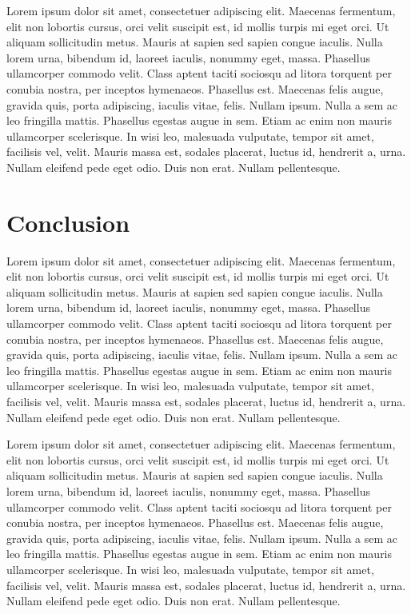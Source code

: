 Lorem ipsum dolor sit amet, consectetuer adipiscing elit. Maecenas fermentum, elit non lobortis cursus, orci velit suscipit est, id mollis turpis mi eget orci. Ut aliquam sollicitudin metus. Mauris at sapien sed sapien congue iaculis. Nulla lorem urna, bibendum id, laoreet iaculis, nonummy eget, massa. Phasellus ullamcorper commodo velit. Class aptent taciti sociosqu ad litora torquent per conubia nostra, per inceptos hymenaeos. Phasellus est. Maecenas felis augue, gravida quis, porta adipiscing, iaculis vitae, felis. Nullam ipsum. Nulla a sem ac leo fringilla mattis. Phasellus egestas augue in sem. Etiam ac enim non mauris ullamcorper scelerisque. In wisi leo, malesuada vulputate, tempor sit amet, facilisis vel, velit. Mauris massa est, sodales placerat, luctus id, hendrerit a, urna. Nullam eleifend pede eget odio. Duis non erat. Nullam pellentesque.

\section{Conclusion}


Lorem ipsum dolor sit amet, consectetuer adipiscing elit. Maecenas fermentum, elit non lobortis cursus, orci velit suscipit est, id mollis turpis mi eget orci. Ut aliquam sollicitudin metus. Mauris at sapien sed sapien congue iaculis. Nulla lorem urna, bibendum id, laoreet iaculis, nonummy eget, massa. Phasellus ullamcorper commodo velit. Class aptent taciti sociosqu ad litora torquent per conubia nostra, per inceptos hymenaeos. Phasellus est. Maecenas felis augue, gravida quis, porta adipiscing, iaculis vitae, felis. Nullam ipsum. Nulla a sem ac leo fringilla mattis. Phasellus egestas augue in sem. Etiam ac enim non mauris ullamcorper scelerisque. In wisi leo, malesuada vulputate, tempor sit amet, facilisis vel, velit. Mauris massa est, sodales placerat, luctus id, hendrerit a, urna. Nullam eleifend pede eget odio. Duis non erat. Nullam pellentesque.

Lorem ipsum dolor sit amet, consectetuer adipiscing elit. Maecenas fermentum, elit non lobortis cursus, orci velit suscipit est, id mollis turpis mi eget orci. Ut aliquam sollicitudin metus. Mauris at sapien sed sapien congue iaculis. Nulla lorem urna, bibendum id, laoreet iaculis, nonummy eget, massa. Phasellus ullamcorper commodo velit. Class aptent taciti sociosqu ad litora torquent per conubia nostra, per inceptos hymenaeos. Phasellus est. Maecenas felis augue, gravida quis, porta adipiscing, iaculis vitae, felis. Nullam ipsum. Nulla a sem ac leo fringilla mattis. Phasellus egestas augue in sem. Etiam ac enim non mauris ullamcorper scelerisque. In wisi leo, malesuada vulputate, tempor sit amet, facilisis vel, velit. Mauris massa est, sodales placerat, luctus id, hendrerit a, urna. Nullam eleifend pede eget odio. Duis non erat. Nullam pellentesque.
